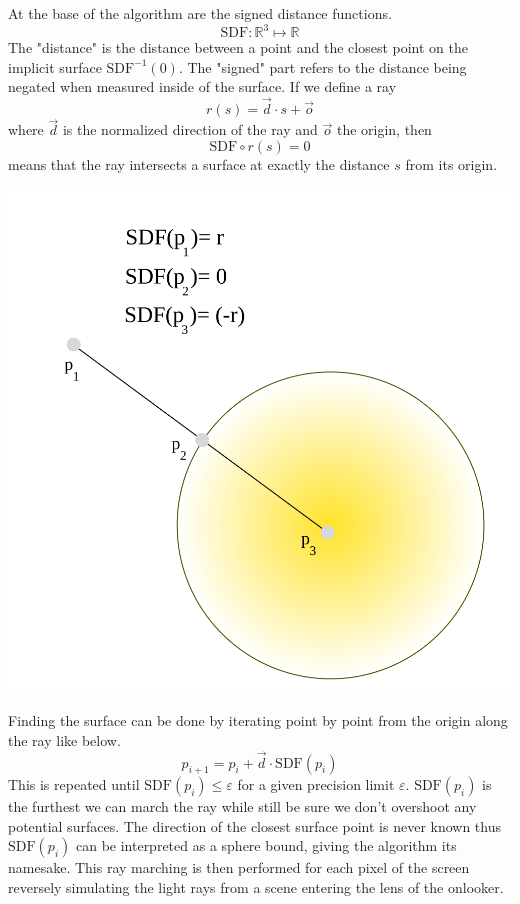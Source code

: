 \begin{minipage}{0.6\textwidth} 

    At the base of the algorithm are the signed distance functions.
    $$\text{SDF}:\mathbb{R}^{3}\mapsto\mathbb{R}$$ The "distance" is the
    distance between a point and the closest point on the implicit surface
    $\text{SDF}^{-1}(0)$. The "signed" part refers to the distance being
    negated when measured inside of the surface.  If we define a ray $$r(s) =
    \vec{d} \cdot s + \vec{o}$$ where $\vec{d}$ is the normalized direction of
    the ray and $\vec{o}$ the origin, then $$\text{SDF}\circ r(s) = 0$$ means
    that the ray intersects a surface at exactly the distance $s$ from its
    origin.

\end{minipage} 
\hfill
\noindent
\begin{minipage}{0.3\textwidth}
    \includegraphics[width=\linewidth]{figure/SDF} 
\end{minipage}

\bigskip

Finding the surface can be done by iterating point by point from the origin
along the ray like below. $$p_{i+1} = p_i + \vec{d}\cdot \text{SDF}(p_i)$$ This is
repeated until $\text{SDF}(p_i) \leq \varepsilon$ for a given precision limit
$\varepsilon$. $\text{SDF}(p_i)$ is the furthest we can march the ray while
still be sure we don't overshoot any potential surfaces.  The direction of the
closest surface point is never known thus $\text{SDF}(p_i)$ can be interpreted
as a sphere bound, giving the algorithm its namesake. This ray marching is then
performed for each pixel of the screen reversely simulating the light rays from a
scene entering the lens of the onlooker.
	
